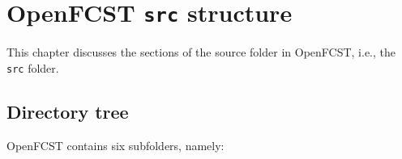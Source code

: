 \chapter{OpenFCST \texttt{src} structure}

This chapter discusses the sections of the source folder in OpenFCST, i.e., the \texttt{src} folder.
\section{Directory tree}
OpenFCST contains six subfolders, namely:
